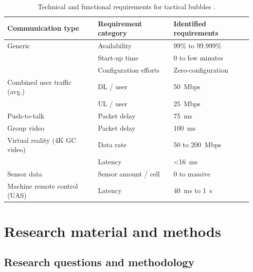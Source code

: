 \documentclass[english, 12pt, a4paper, elec, utf8, a-1b, online]{aaltothesis}
\begin{document}
\begin{table}[h]
  \centering
  \caption{Technical and functional requirements for tactical bubbles \cite{heikkila2021field}.}
  \begin{tabular}{@{}lll@{}}
  \toprule
  Communication type            & Requirement category  & Identified requirements \\ \midrule
  Generic                       & Availability          & 99\% to 99.999\%        \\
                                & Start-up time         & 0 to few minutes        \\
                                & Configuration efforts & Zero-configuration      \\ \addlinespace[0.5em]
  Combined user traffic (avg.)  & DL / user             & 50~Mbps                 \\
                                & UL / user             & 25~Mbps                 \\ \addlinespace[0.5em]
  Push-to-talk                  & Packet delay          & 75~ms                   \\ \addlinespace[0.5em]
  Group video                   & Packet delay          & 100~ms                  \\ \addlinespace[0.5em]
  Virtual reality (4K GC video) & Data rate             & 50 to 200~Mbps          \\
                                & Latency               & \textless 16~ms         \\ \addlinespace[0.5em]
  Sensor data                   & Sensor amount / cell  & 0 to massive            \\ \addlinespace[0.5em]
  Machine remote control (UAS)  & Latency               & 40~ms to 1~s            \\ \bottomrule
  \end{tabular}
  \label{table-mcx-requirements}
\end{table}

\clearpage

\section{Research material and methods}

\subsection{Research questions and methodology}
\end{document}
